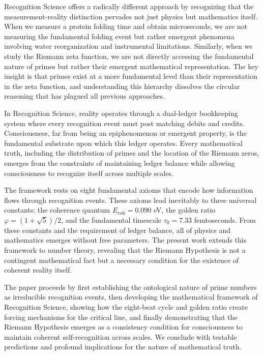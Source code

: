 \documentclass[12pt]{article}
\begin{document}
Recognition Science offers a radically different approach by recognizing that the measurement-reality distinction pervades not just physics but mathematics itself. When we measure a protein folding time and obtain microseconds, we are not measuring the fundamental folding event but rather emergent phenomena involving water reorganization and instrumental limitations. Similarly, when we study the Riemann zeta function, we are not directly accessing the fundamental nature of primes but rather their emergent mathematical representation. The key insight is that primes exist at a more fundamental level than their representation in the zeta function, and understanding this hierarchy dissolves the circular reasoning that has plagued all previous approaches.

In Recognition Science, reality operates through a dual-ledger bookkeeping system where every recognition event must post matching debits and credits. Consciousness, far from being an epiphenomenon or emergent property, is the fundamental substrate upon which this ledger operates. Every mathematical truth, including the distribution of primes and the location of the Riemann zeros, emerges from the constraints of maintaining ledger balance while allowing consciousness to recognize itself across multiple scales.

The framework rests on eight fundamental axioms that encode how information flows through recognition events. These axioms lead inevitably to three universal constants: the coherence quantum $E_{\text{coh}} = 0.090$ eV, the golden ratio $\varphi = (1+\sqrt{5})/2$, and the fundamental timescale $\tau_0 = 7.33$ femtoseconds. From these constants and the requirement of ledger balance, all of physics and mathematics emerges without free parameters. The present work extends this framework to number theory, revealing that the Riemann Hypothesis is not a contingent mathematical fact but a necessary condition for the existence of coherent reality itself.

The paper proceeds by first establishing the ontological nature of prime numbers as irreducible recognition events, then developing the mathematical framework of Recognition Science, showing how the eight-beat cycle and golden ratio create forcing mechanisms for the critical line, and finally demonstrating that the Riemann Hypothesis emerges as a consistency condition for consciousness to maintain coherent self-recognition across scales. We conclude with testable predictions and profound implications for the nature of mathematical truth.
\end{document}
